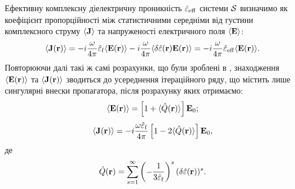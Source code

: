 \documentclass[14pt,twoside]{vakthesis}
\begin{document}
Ефективну комплексну діелектричну проникність $\hat{\varepsilon}_{\rm eff}$ системи $\cal S$ визначимо
як коефіцієнт пропорційності між статистичними середніми від густини комплексного струму $\langle{\bf J}\rangle$ та напруженості електричного поля $\langle {\bf E} \rangle$:
\begin{equation}\label{eq:eff_complex}
\langle {\bf{J}} ({\bf{r}})\rangle =-i\frac{\omega}{4\pi} \hat{\varepsilon}_{\rm f} \langle {\bf{E}} ({\bf{r}}) \rangle
-i\frac{\omega}{4\pi}\langle \delta\hat{\varepsilon} ({\bf{r}}) {\bf{E}}
({\bf{r}}) \rangle = -i\frac{\omega}{4\pi} \hat{\varepsilon}_{\rm
	eff} \langle {\bf{E}} ({\bf{r}}) \rangle.
\end{equation}
Повторюючи далі такі ж самі розрахунки, що були зроблені в \cite{Sushko2007, Sushko2017}, знаходження $\langle {\bf E}({\bf r}) \rangle$ та $\langle {\bf J}({\bf r}) \rangle$ зводиться до усереднення ітераційного ряду, що містить лише сингулярні внески пропагатора, після розрахунку яких отримаємо:
\begin{equation}\label{eq:E_average-complex}
\langle {\bf E} ({\bf r}) \rangle = \left[ 1 + \langle \hat{Q}({\bf r}) \rangle \right] {\bf E}_0;
\end{equation}
\begin{equation}\label{eq:C_average}
\langle {\bf J} ({\bf r}) \rangle = - i \frac{\omega\hat{\varepsilon}_{\rm f}}{4\pi} \left[ 1 - 2\langle \hat{Q}({\bf r}) \rangle \right] {\bf E}_0,
\end{equation}
де
\begin{equation}\label{eq:Q-complex}
\hat{Q}({\bf r}) = \sum\limits_{s=1}^{\infty} \left( - \frac{1}{3\hat{\varepsilon}_{\rm f}} \right)^s (\delta\hat{\varepsilon}({\bf r}))^s.
\end{equation}
\end{document}
